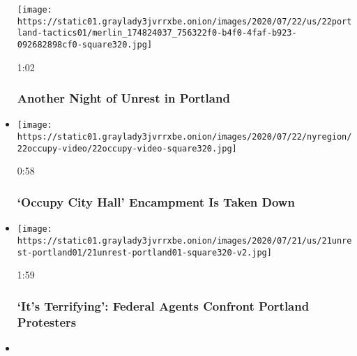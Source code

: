 \begin{itemize}
  \texttt{[image: https://static01.graylady3jvrrxbe.onion/images/2020/07/22/us/22portland-tactics01/merlin\_174824037\_756322f0-b4f0-4faf-b923-092682898cf0-square320.jpg]}

  1:02

  \hypertarget{another-night-of-unrest-in-portland}{%
  \subsubsection{Another Night of Unrest in
  Portland}\label{another-night-of-unrest-in-portland}}
\item
  \href{https://www.nytimes3xbfgragh.onion/video/us/politics/100000007250886/occupy-city-hall-new-york.html?action=click\&module=video-series-bar\&region=header\&pgtype=Article\&playlistId=video/minneapolis-george-floyd-death-video}{}

  \texttt{[image: https://static01.graylady3jvrrxbe.onion/images/2020/07/22/nyregion/22occupy-video/22occupy-video-square320.jpg]}

  0:58

  \hypertarget{occupy-city-hall-encampment-is-taken-down}{%
  \subsubsection{`Occupy City Hall' Encampment Is Taken
  Down}\label{occupy-city-hall-encampment-is-taken-down}}
\item
  \href{https://www.nytimes3xbfgragh.onion/video/us/100000007248945/portland-protests-federal-agents.html?action=click\&module=video-series-bar\&region=header\&pgtype=Article\&playlistId=video/minneapolis-george-floyd-death-video}{}

  \texttt{[image: https://static01.graylady3jvrrxbe.onion/images/2020/07/21/us/21unrest-portland01/21unrest-portland01-square320-v2.jpg]}

  1:59

  \hypertarget{its-terrifying-federal-agents-confront-portland-protesters}{%
  \subsubsection{`It's Terrifying': Federal Agents Confront Portland
  Protesters}\label{its-terrifying-federal-agents-confront-portland-protesters}}
\item
  \href{https://www.nytimes3xbfgragh.onion/video/us/politics/100000007248877/dozens-of-moms-join-protest-in-portland.html?action=click\&module=video-series-bar\&region=header\&pgtype=Article\&playlistId=video/minneapolis-george-floyd-death-video}{}


\end{itemize}
